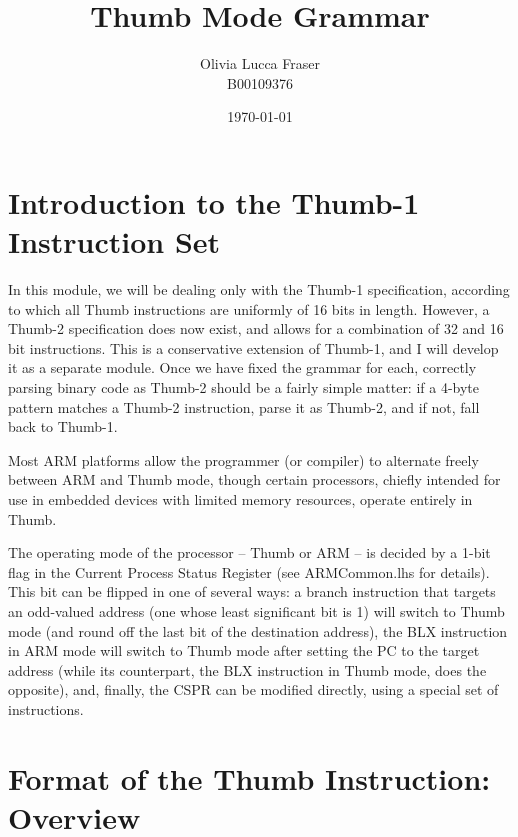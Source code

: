 \documentclass{article}
\title{Thumb Mode Grammar}
\author{Olivia Lucca Fraser\\B00109376}
\date{\today}
\begin{document}

\section{Introduction to the Thumb-1 Instruction Set}

In this module, we will be dealing only with the Thumb-1 specification,
according to which all Thumb instructions are uniformly of 16 bits in length.
However, a Thumb-2 specification does now exist, and allows for a combination of 32 and 16 bit instructions. This is a conservative extension of Thumb-1, and I will develop it as a separate module. Once we have fixed the grammar for each, correctly parsing binary code as Thumb-2 should be a fairly simple matter: if a 4-byte pattern matches a Thumb-2 instruction, parse it as Thumb-2, and if not, fall
back to Thumb-1.

Most ARM platforms allow the programmer (or compiler) to alternate freely between ARM and Thumb mode, though certain processors, chiefly intended for use in embedded devices with limited memory resources, operate entirely in Thumb.

The operating mode of the processor -- Thumb or ARM -- is decided by a 1-bit flag in the Current Process Status Register (see ARMCommon.lhs for details). This bit can be flipped in one of several ways: a branch instruction that targets an odd-valued address (one whose least significant bit is 1) will switch to Thumb mode (and round off the last bit of the destination address), the BLX instruction in ARM mode will switch to Thumb mode after setting the PC to the target address (while its counterpart, the BLX instruction in Thumb mode, does the opposite), and, finally, the CSPR can be modified directly, using a special set of instructions.

\section{Format of the Thumb Instruction: Overview}
\end{document}
